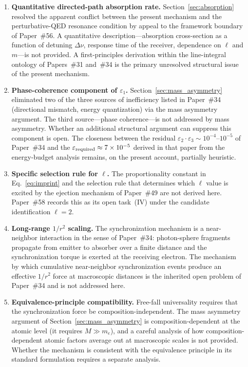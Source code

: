 \documentclass[%
 reprint, amsmath,amssymb, aps, prb, ]{revtex4-2}
\numberwithin{equation}{section}
\begin{document}
\begin{enumerate}[label=(\Alph*), leftmargin=2em, itemsep=4pt]

\item \textbf{Quantitative directed-path absorption rate.}
Section~\ref{sec:absorption} resolved the apparent conflict between the present mechanism and the perturbative-QED resonance condition by appeal to the framework boundary of Paper~\#56. A quantitative description---absorption cross-section as a function of detuning $\Delta\nu$, response time of the receiver, dependence on $\ell$ and $m$---is not provided. A first-principles derivation within the line-integral ontology of Papers~\#31 and~\#34 is the primary unresolved structural issue of the present mechanism.

\item \textbf{Phase-coherence component of $\varepsilon_1$.}
Section~\ref{sec:mass_asymmetry} eliminated two of the three sources of inefficiency listed in Paper~\#34 (directional mismatch, energy quantization) via the mass asymmetry argument. The third source---phase coherence---is not addressed by mass asymmetry. Whether an additional structural argument can suppress this component is open. The closeness between the residual $\varepsilon_2 \cdot \varepsilon_3 \sim 10^{-4}$--$10^{-5}$ of Paper~\#34 and the $\varepsilon_{\rm required} \approx 7\times 10^{-5}$ derived in that paper from the energy-budget analysis remains, on the present account, partially heuristic.

\item \textbf{Specific selection rule for $\ell$.}
The proportionality constant in Eq.~\eqref{eq:imprint} and the selection rule that determines which $\ell$ value is excited by the ejection mechanism of Paper~\#49 are not derived here. Paper~\#58 records this as its open task~(IV) under the candidate identification $\ell = 2$.

\item \textbf{Long-range $1/r^2$ scaling.}
The synchronization mechanism is a near-neighbor interaction in the sense of Paper~\#34: photon-sphere fragments propagate from emitter to absorber over a finite distance and the synchronization torque is exerted at the receiving electron. The mechanism by which cumulative near-neighbor synchronization events produce an effective $1/r^2$ force at macroscopic distances is the inherited open problem of Paper~\#34 and is not addressed here.

\item \textbf{Equivalence-principle compatibility.}
Free-fall universality requires that the synchronization force be composition-independent. The mass asymmetry argument of Section~\ref{sec:mass_asymmetry} is composition-dependent at the atomic level (it requires $M \gg m_e$), and a careful analysis of how composition-dependent atomic factors average out at macroscopic scales is not provided. Whether the mechanism is consistent with the equivalence principle in its standard formulation requires a separate analysis.

\end{enumerate}
\end{document}
